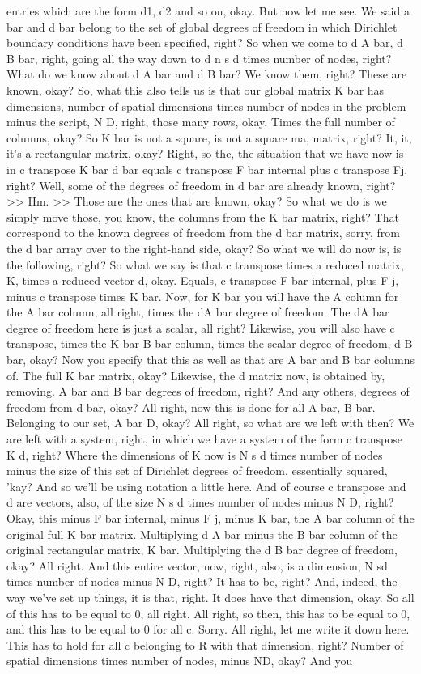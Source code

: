 \documentclass[10pt]{article}
\begin{document}
entries which are the form d1, d2 and so on, okay. But now let me see. We said a bar and d bar belong to the set of global degrees of freedom in which Dirichlet boundary conditions have been specified, right? So when we come to d A bar, d B bar, right, going all the way down to d n s d times number of nodes, right? What do we know about d A bar and d B bar? We know them, right? These are known, okay? So, what this also tells us is that our global matrix K bar has dimensions, number of spatial dimensions times number of nodes in the problem minus the script, N D, right, those many rows, okay. Times the full number of columns, okay? So K bar is not a square, is not a square ma, matrix, right? It, it, it's a rectangular matrix, okay? Right, so the, the situation that we have now is in c transpose K bar d bar equals c transpose F bar internal plus c transpose Fj, right? Well, some of the degrees of freedom in d bar are already known, right? >> Hm. >> Those are the ones that are known, okay? So what we do is we simply move those, you know, the columns from the K bar matrix, right? That correspond to the known degrees of freedom from the d bar matrix, sorry, from the d bar array over to the right-hand side, okay? So what we will do now is, is the following, right? So what we say is that c transpose times a reduced matrix, K, times a reduced vector d, okay. Equals, c transpose F bar internal, plus F j, minus c transpose times K bar. Now, for K bar you will have the A column for the A bar column, all right, times the dA bar degree of freedom. The dA bar degree of freedom here is just a scalar, all right? Likewise, you will also have c transpose, times the K bar B bar column, times the scalar degree of freedom, d B bar, okay? Now you specify that this as well as that are A bar and B bar columns of. The full K bar matrix, okay? Likewise, the d matrix now, is obtained by, removing. A bar and B bar degrees of freedom, right? And any others, degrees of freedom from d bar, okay? All right, now this is done for all A bar, B bar. Belonging to our set, A bar D, okay? All right, so what are we left with then? We are left with a system, right, in which we have a system of the form c transpose K d, right? Where the dimensions of K now is N s d times number of nodes minus the size of this set of Dirichlet degrees of freedom, essentially squared, 'kay? And so we'll be using notation a little here. And of course c transpose and d are vectors, also, of the size N s d times number of nodes minus N D, right? Okay, this minus F bar internal, minus F j, minus K bar, the A bar column of the original full K bar matrix. Multiplying d A bar minus the B bar column of the original rectangular matrix, K bar. Multiplying the d B bar degree of freedom, okay? All right. And this entire vector, now, right, also, is a dimension, N sd times number of nodes minus N D, right? It has to be, right? And, indeed, the way we've set up things, it is that, right. It does have that dimension, okay. So all of this has to be equal to 0, all right. All right, so then, this has to be equal to 0, and this has to be equal to 0 for all c. Sorry. All right, let me write it down here. This has to hold for all c belonging to R with that dimension, right? Number of spatial dimensions times number of nodes, minus ND, okay? And you 
\end{document}
